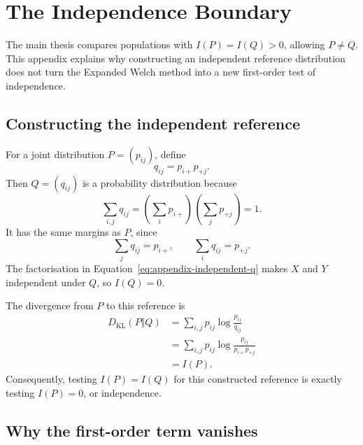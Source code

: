 \chapter{The Independence Boundary}
\label{app:independence-boundary}

The main thesis compares populations with \(I(P)=I(Q)>0\), allowing
\(P\ne Q\). This appendix
explains why constructing an independent reference distribution does not turn
the Expanded Welch method into a new first-order test of independence.

\section{Constructing the independent reference}

For a joint distribution $P=(p_{ij})$, define
\begin{equation}
  q_{ij}=p_{i+}p_{+j}.
  \label{eq:appendix-independent-q}
\end{equation}
Then $Q=(q_{ij})$ is a probability distribution because
\begin{equation}
  \sum_{i,j}q_{ij}
  =\left(\sum_i p_{i+}\right)
   \left(\sum_j p_{+j}\right)=1.
\end{equation}
It has the same margins as \(P\), since
\begin{equation}
  \sum_jq_{ij}=p_{i+},
  \qquad
  \sum_iq_{ij}=p_{+j}.
\end{equation}
The factorisation in Equation~\eqref{eq:appendix-independent-q} makes \(X\)
and \(Y\) independent under \(Q\), so \(I(Q)=0\).

The divergence from $P$ to this reference is
\begin{align}
  D_{\mathrm{KL}}(P\Vert Q)
  &=\sum_{i,j}p_{ij}\log\frac{p_{ij}}{q_{ij}}\\
  &=\sum_{i,j}p_{ij}\log\frac{p_{ij}}{p_{i+}p_{+j}}\\
  &=I(P).
\end{align}
Consequently, testing \(I(P)=I(Q)\) for this constructed reference is exactly
testing \(I(P)=0\), or independence.

\section{Why the first-order term vanishes}

